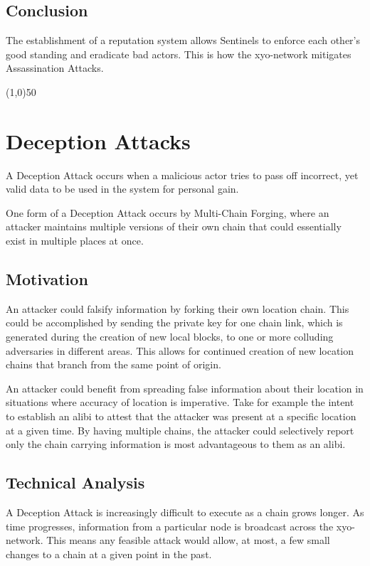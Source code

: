 \documentclass{article}
\begin{document}
\subsection{Conclusion}

The establishment of a reputation system allows Sentinels to enforce each other's good standing and eradicate bad actors. This is how the \Gls{xyo-network} mitigates Assassination Attacks.

\begin{center}
\line(1,0){50}
\end{center}

\section{Deception Attacks}
A Deception Attack occurs when a malicious actor tries to pass off incorrect, yet valid data to be used in the system for personal gain.

One form of a Deception Attack occurs by Multi-Chain Forging, where an attacker maintains multiple versions of their own chain that could essentially exist in multiple places at once.

\subsection{Motivation}

An attacker could falsify information by forking their own location chain. This could be accomplished by sending the private key for one chain link, which is generated during the creation of new local blocks, to one or more colluding adversaries in different areas. This allows for continued creation of new location chains that branch from the same point of origin.

An attacker could benefit from spreading false information about their location in situations where accuracy of location is imperative. Take for example the intent to establish an alibi to attest that the attacker was present at a specific location at a given time. By having multiple chains, the attacker could selectively report only the chain carrying information is most advantageous to them as an alibi.

\subsection{Technical Analysis}

A Deception Attack is increasingly difficult to execute as a chain grows longer. As time progresses, information from a particular node is broadcast across the \Gls{xyo-network}. This means any feasible attack would allow, at most, a few small changes to a chain at a given point in the past.
\end{document}
